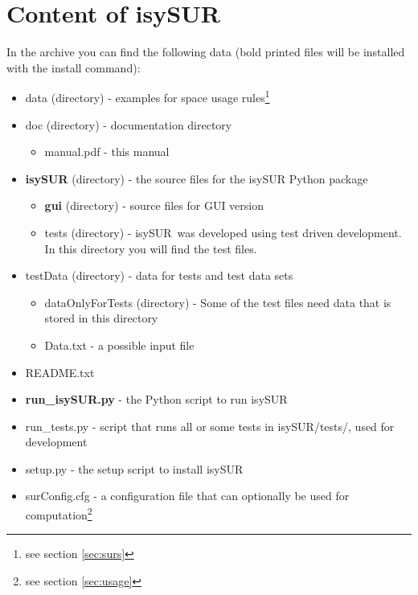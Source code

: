 \documentclass[11pt,fleqn]{book} %
\newcommand{\todol}{\todo[inline]} %
\newcommand{\ProjectTitle}{isySUR}
\newcommand{\pt}{\ProjectTitle}
\begin{document}
\section{Content of \ProjectTitle}
In the archive you can find the following data (bold printed files will be installed with the install command):
\begin{itemize}
	\item data (directory) - examples for space usage rules\footnote{see section \ref{sec:surs}}
	\item doc (directory) - documentation directory
	\begin{itemize}
		\item manual.pdf - this manual
		\todol{add pydoc}
	\end{itemize}
	\item \textbf{isySUR} (directory) - the source files for the isySUR Python package
	\begin{itemize}
		\item \textbf{gui} (directory) - source files for GUI version
		\item tests (directory) - \pt\ was developed using test driven development. In this directory you will find the test files.
	\end{itemize}
	\item testData (directory) - data for tests and test data sets
	\begin{itemize}
		\item dataOnlyForTests (directory) - Some of the test files need data that is stored in this directory
		\item Data.txt - a possible input file
	\end{itemize}
	\item README.txt
	\item \textbf{run\_isySUR.py} - the Python script to run \pt
	\item run\_tests.py - script that runs all or some tests in isySUR/tests/, used for development
	\item setup.py - the setup script to install \pt
	\item surConfig.cfg - a configuration file that can optionally be used for computation\footnote{see section \ref{sec:usage}}
\end{itemize}


\end{document}
